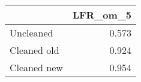 \begin{tabular}{lr}
\toprule
{} & LFR_om_5 \\
\midrule
Uncleaned   &    0.573 \\
Cleaned old &    0.924 \\
Cleaned new &    0.954 \\
\bottomrule
\end{tabular}
